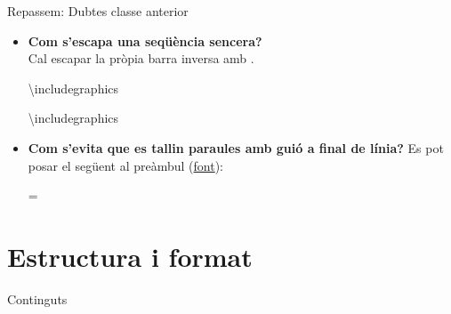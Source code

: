 \begin{frame}[fragile]{Repassem: Dubtes classe anterior}
\begin{itemize}
    \item \textbf{Com s'escapa una seqüència sencera?}\\
    Cal escapar la pròpia barra inversa \keystroke{\textbackslash} amb .

\begin{exampletwouptiny}
\textbackslash includegraphics

\textbackslash{}includegraphics
\end{exampletwouptiny}
\item \textbf{Com s'evita que es tallin paraules amb guió a final de línia?}
Es pot posar el següent al preàmbul (\href{https://tex.stackexchange.com/questions/5036/how-to-prevent-latex-from-hyphenating-the-entire-document}{font}):

\begin{exampletiny}
\emergencystretch=\maxdimen
{}
\end{exampletiny}
\end{itemize}
\end{frame}


\section{Estructura i format}
\begin{frame}{Continguts}
\begin{multicols}{2}
\tableofcontents[currentsection]
\end{multicols}
\end{frame}

